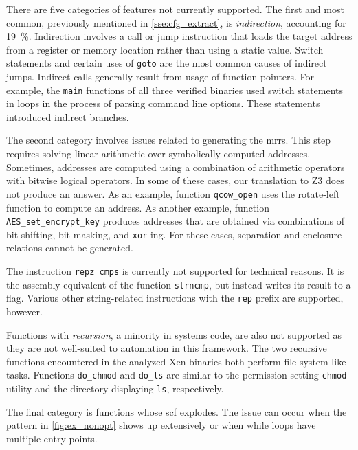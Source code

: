There are five categories of features not currently supported.
The first and most common, previously mentioned in \cref{sse:cfg_extract},
is \emph{indirection}, accounting for \SI{19}{\percent}.%
Indirection involves a call or jump instruction
that loads the target address from a register or memory location
rather than using a static value.
Switch statements and certain uses of \texttt{goto}
are the most common causes of indirect jumps.
Indirect calls generally result from usage of function pointers.
For example, the \lstinline|main| functions of all three verified binaries
used switch statements in loops in the process of parsing command line options.
These statements introduced indirect branches.

The second category involves issues related to generating the \acp{mrr}.
This step requires solving linear arithmetic over symbolically computed addresses.%
Sometimes, addresses are computed using a combination of arithmetic operators%
with bitwise logical operators.%
In some of these cases, our translation to Z3 does not produce an answer.%
As an example, function \texttt{qcow\_open}
uses the rotate-left function to compute an address.
As another example, function \texttt{AES\_set\_encrypt\_key}
produces addresses that are obtained via combinations of bit-shifting,
bit masking, and \texttt{xor}-ing.
For these cases, separation and enclosure relations cannot be generated.

The instruction \texttt{repz cmps} is currently not supported for technical reasons.
It is the assembly equivalent of the function \texttt{strncmp},
but instead writes its result to a flag.
Various other string-related instructions with the \texttt{rep} prefix are supported,
however.

Functions with \emph{recursion}, a minority in systems code, are also not supported
as they are not well-suited to automation in this framework.
The two recursive functions encountered in the analyzed Xen binaries
both perform file-system-like tasks.
Functions \lstinline|do_chmod| and \lstinline|do_ls|
are similar to the permission-setting \lstinline|chmod| utility
and the directory-displaying \lstinline|ls|, respectively.

The final category is functions whose \ac{scf} explodes.
The issue can occur when the pattern in \cref{fig:ex_nonopt} shows up extensively
or when while loops have multiple entry points.


